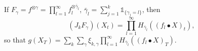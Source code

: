 


\begin{remark}
If $F_{\gamma} = f^{\otimes \gamma} = \prod_{l=1}^{\infty} f_l^{\otimes \bar{\gamma}_l}$, $\bar{\gamma}_l = \sum_{j=1}^{k} \mathds{1}_{\{\gamma_j = l\}}$, then 
$$(J_k F_{\gamma})(X_t) = \prod_{l=1}^{\infty} H_{\bar{\gamma}_l}((f_l \bullet X )_t),$$
so that $
    g(X_T) = \sum_k \sum_{\gamma} \xi_{k,\gamma} \prod_{l=1}^{\infty}  H_{\bar{\gamma}_l}((f_l \bullet X )_T)$.
\end{remark}
